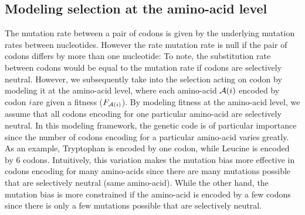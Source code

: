 \subsection{Modeling selection at the amino-acid level}
\label{sec-mut-bias:aa-selection}
The mutation rate between a pair of \glspl{codon} is given by the underlying mutation rates between nucleotides.
However the rate mutation rate is null if the pair of \glspl{codon} differs by more than one nucleotide:
To note, the \gls{substitution} rate between \glspl{codon} would be equal to the mutation rate if \glspl{codon} are selectively \gls{neutral}.
However, we subsequently take into the selection acting on \gls{codon} by modeling it at the amino-acid level, where each amino-acid $\mathcal{A}({i})$ encoded by codon ${i} $are given a fitness ($F_{\mathcal{A}({i})}$).
By modeling fitness at the amino-acid level, we assume that all \glspl{codon} encoding for one particular amino-acid are selectively \gls{neutral}.
In this modeling framework, the genetic code is of particular importance since the number of \glspl{codon} encoding for a particular amino-acid varies greatly.
As an example, Tryptophan is encoded by one \gls{codon}, while Leucine is encoded by 6 \glspl{codon}.
Intuitively, this variation makes the mutation bias more effective in \glspl{codon} encoding for many amino-acids since there are many mutations possible that are selectively \gls{neutral} (same amino-acid).
While the other hand, the mutation bias is more constrained if the amino-acid is encoded by a few \glspl{codon} since there is only a few mutations possible that are selectively \gls{neutral}.\\

